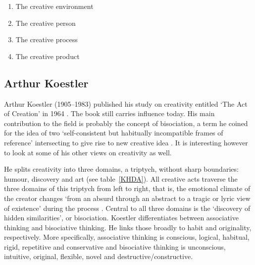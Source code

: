 \begin{enumerate}
  \item The creative environment
  \item The creative person
  \item The creative process
  \item The creative product
\end{enumerate}


\subsection*{Arthur Koestler}

Arthur Koestler (1905--1983) published his study on creativity entitled `The Act of Creation' in 1964 \autocite{Koestler1964}. The book still carries influence today. His main contribution to the field is probably the concept of \ac{bisociation}, a term he coined for the idea of two `self-consistent but habitually incompatible frames of reference' intersecting to give rise to new creative idea \autocite[p.35]{Koestler1964}. It is interesting however to look at some of his other views on creativity as well.

He splits creativity into three domains, a triptych, without sharp boundaries: humour, discovery and art (see table~\ref{KHDA}). All creative acts traverse the three domains of this triptych from left to right, that is, the emotional climate of the creator changes `from an absurd through an abstract to a tragic or lyric view of existence' during the process \autocite[p.27]{Koestler1964}. Central to all three domains is the `discovery of hidden similarities', or bisociation. Koestler differentiates between associative thinking and bisociative thinking. He links those broadly to habit and originality, respectively. More specifically, associative thinking is conscious, logical, habitual, rigid, repetitive and conservative and bisociative thinking is unconscious, intuitive, original, flexible, novel and destructive/constructive.


